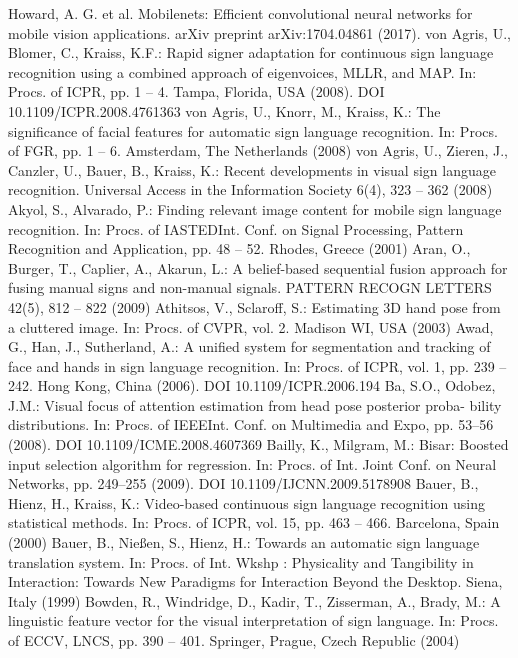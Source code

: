 \documentclass[12pt,a4paper]{report}
\begin{document}
\begin{thebibliography}{00}
	 Howard, A. G. et al. Mobilenets: Efficient convolutional neural networks for mobile vision applications. arXiv preprint arXiv:1704.04861 (2017).
	 von Agris, U., Blomer, C., Kraiss, K.F.: Rapid signer adaptation for continuous sign language recognition using a combined approach of eigenvoices, MLLR, and MAP. In: Procs. of ICPR, pp. 1 – 4. Tampa, Florida, USA (2008). DOI 10.1109/ICPR.2008.4761363
	 von Agris, U., Knorr, M., Kraiss, K.: The significance of facial features for automatic sign language recognition. In: Procs. of FGR, pp. 1 – 6. Amsterdam, The Netherlands (2008)
	 von Agris, U., Zieren, J., Canzler, U., Bauer, B., Kraiss, K.: Recent developments in visual sign language recognition. Universal Access in the Information Society 6(4), 323 – 362 (2008)
	 Akyol, S., Alvarado, P.: Finding relevant image content for mobile sign language recognition. In: Procs. of IASTEDInt. Conf. on Signal Processing, Pattern Recognition and Application, pp. 48 – 52. Rhodes, Greece (2001)
	 Aran, O., Burger, T., Caplier, A., Akarun, L.: A belief-based sequential fusion approach for fusing manual signs and non-manual signals. PATTERN RECOGN LETTERS 42(5), 812 – 822 (2009)
	 Athitsos, V., Sclaroff, S.: Estimating 3D hand pose from a cluttered image. In: Procs. of CVPR, vol. 2. Madison WI, USA (2003)
	 Awad, G., Han, J., Sutherland, A.: A unified system for segmentation and tracking of face and hands in sign language recognition. In: Procs. of ICPR, vol. 1, pp. 239 – 242. Hong Kong, China (2006). DOI 10.1109/ICPR.2006.194
	 Ba, S.O., Odobez, J.M.: Visual focus of attention estimation from head pose posterior proba- bility distributions. In: Procs. of IEEEInt. Conf. on Multimedia and Expo, pp. 53–56 (2008). DOI 10.1109/ICME.2008.4607369
	 Bailly, K., Milgram, M.: Bisar: Boosted input selection algorithm for regression. In: Procs. of Int. Joint Conf. on Neural Networks, pp. 249–255 (2009). DOI 10.1109/IJCNN.2009.5178908
	 Bauer, B., Hienz, H., Kraiss, K.: Video-based continuous sign language recognition using statistical methods. In: Procs. of ICPR, vol. 15, pp. 463 – 466. Barcelona, Spain (2000)
	 Bauer, B., Nießen, S., Hienz, H.: Towards an automatic sign language translation system. In: Procs. of Int. Wkshp : Physicality and Tangibility in Interaction: Towards New Paradigms for Interaction Beyond the Desktop. Siena, Italy (1999)
	 Bowden, R., Windridge, D., Kadir, T., Zisserman, A., Brady, M.: A linguistic feature vector for the visual interpretation of sign language. In: Procs. of ECCV, LNCS, pp. 390 – 401. Springer, Prague, Czech Republic (2004)

\end{thebibliography}
\end{document}
